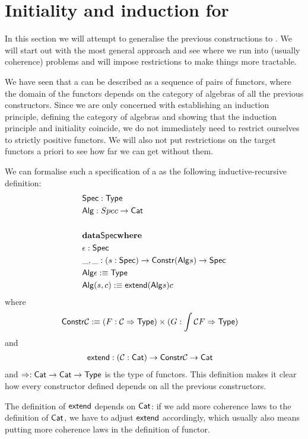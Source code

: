 \documentclass[a4paper,10pt]{article}
\begin{document}
\section{Initiality and induction for \hits}
\label{sec:hits}

In this section we will attempt to generalise the previous
constructions to \hits. We will start out with the most general
approach and see where we run into (usually coherence) problems and
will impose restrictions to make things more tractable.

We have seen that a \hit can be described as a sequence of pairs of
functors, where the domain of the functors depends on the category of
algebras of all the previous constructors. Since we are only concerned
with establishing an induction principle, defining the category of
algebras and showing that the induction principle and initiality
coincide, we do not immediately need to restrict ourselves to strictly
positive functors. We will also not put restrictions on the target
functors a priori to see how far we can get without them.

We can formalise such a specification of a \hit as the
following inductive-recursive definition:
%
\begin{align*}
  &\mathsf{Spec} : \mathsf{Type} \\
  &\mathsf{Alg} : Spec \to \mathsf{Cat} \\
  \\
  &{\bf data} \mathsf{Spec} {\bf where} \\
  &\epsilon : \mathsf{Spec} \\
  &\_,\_ : (s : \mathsf{Spec}) \to \mathsf{Constr} (\mathsf{Alg} s) \to \mathsf{Spec}    
  \\
  &\mathsf{Alg} \epsilon :\equiv \mathsf{Type}\\
  &\mathsf{Alg} (s , c) :\equiv \mathsf{extend} (\mathsf{Alg} s) c
\end{align*}
%
where
%
\begin{align*}
  &\mathsf{Constr} \mathcal{C} :\equiv (F : \mathcal{C} \Rightarrow \mathsf{Type}) \times (G : \int \mathcal{C} F \Rightarrow \mathsf{Type})
\end{align*}
%
and
%
\begin{align*}
  &\mathsf{extend} : (\mathcal{C} : \mathsf{Cat}) \to \mathsf{Constr} \mathcal{C} \to \mathsf{Cat}
\end{align*}
%
and $\Rightarrow : \mathsf{Cat} \to \mathsf{Cat} \to \mathsf{Type}$ is the type of functors. This
definition makes it clear how every constructor defined depends on all
the previous constructors.

The definition of $\mathsf{extend}$ depends on $\mathsf{Cat}$: if we add more
coherence laws to the definition of $\mathsf{Cat}$, we have to adjust
$\mathsf{extend}$ accordingly, which usually also means putting more coherence
laws in the definition of functor.
\end{document}
